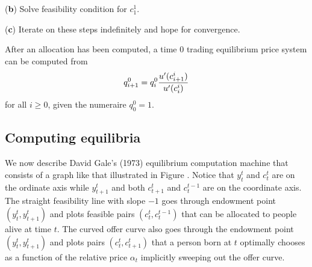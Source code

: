 \medskip
\item{({\bf b})} Solve feasibility condition  for $c_1^1$.

\medskip
\item {({\bf c})} Iterate on these steps indefinitely and hope for convergence.




\medskip

\noindent After an allocation has been computed, a time $0$ 
trading equilibrium price system can be computed from
$$ q^0_{i+1} = q^0_i {u'(c^i_{i+1}) \over u'(c^i_i) } $$
for all $i \geq 0$, given the numeraire $q^0_0 =1$.






\subsection{Computing equilibria}
We now describe David Gale's (1973) equilibrium computation machine that consists of a graph like that
 illustrated
in Figure .
Notice that  $y_t^t$ and  $c_t^t$  are on the ordinate axis while
$y_{t+1}^t$ and both $c_{t+1}^t$ and $c_{t}^{t-1}$ are on the coordinate axis.
The straight  feasibility line with slope $-1$ goes through endowment point $(y_t^t, y^t_{t+1})$ and plots feasible
pairs   $(c_t^t, c_t^{t-1})$ that can be allocated to people alive at time $t$.  The curved offer curve also goes through the endowment point $(y_t^t, y^t_{t+1})$
and plots pairs $(c_t^t, c^t_{t+1})$ that a person born at $t$ optimally chooses as a function of the relative price $\alpha_t$ implicitly
sweeping out the offer curve.   



